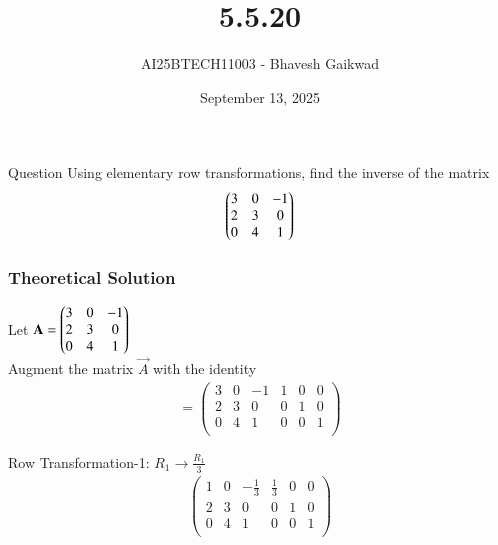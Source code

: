 \documentclass{beamer}
\title
{5.5.20}
\date{September 13, 2025}
\author 
{AI25BTECH11003 - Bhavesh Gaikwad}
\begin{document}
\frame{\titlepage}
\begin{frame}{Question}
Using elementary row transformations, find the inverse of the matrix
$$\begin{pmatrix}3 & 0 & -1 \\ 2 & 3 & 0 \\ 0 & 4 & 1\end{pmatrix}$$
\end{frame}


\begin{frame}[fragile]
    \frametitle{Theoretical Solution}
  Let $\mathbf{A} = \begin{pmatrix}3 & 0 & -1 \\ 2 & 3 & 0 \\ 0 & 4 & 1\end{pmatrix}$\\

Augment the matrix $\vec{A}$ with the identity
\begin{align}
[\vec{A} \, | \, \vec{I}] =
\left(
\begin{array}{ccc|ccc}
3 & 0 & -1 & 1 & 0 & 0 \\
2 & 3 & 0 & 0 & 1 & 0 \\
0 & 4 & 1 & 0 & 0 & 1 \\
\end{array}
\right)
\end{align}

Row Transformation-1: $R_1 \rightarrow \frac{R_1}{3}$
\begin{align}
\left(
\begin{array}{ccc|ccc}
1 & 0 & -\frac{1}{3} & \frac{1}{3} & 0 & 0 \\
2 & 3 & 0 & 0 & 1 & 0 \\
0 & 4 & 1 & 0 & 0 & 1 \\
\end{array}
\right)
\end{align}

\end{frame}
\end{document}
